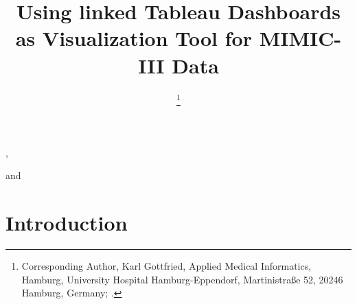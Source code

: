 \documentclass[aac,crcready]{iosart2x}
\begin{document}
\begin{frontmatter}

{\centering \title{Using linked Tableau Dashboards as Visualization Tool for MIMIC-III Data
}}


\author[A]{ %
\thanks{Corresponding Author, Karl Gottfried, Applied Medical Informatics, Hamburg, University Hospital Hamburg-Eppendorf, Martinistraße 52, 20246 Hamburg, Germany;  .}},
\author[A]{ }
and
\author[A]{ }
\address[A]{Applied Medical Informatics, , Germany, ,
}
\address[B]{Department first, ,
Abbreviate US states, }


\begin{abstract}


\end{abstract}

\begin{keyword}
\end{keyword}

\end{frontmatter}


\section{Introduction}\label{s1}
\end{document}
